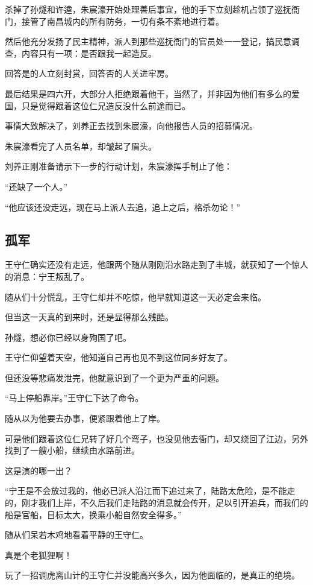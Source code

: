 \begin{multicols}{\theparacolNo}
		杀掉了孙燧和许逵，朱宸濠开始处理善后事宜，他的手下立刻趁机占领了巡抚衙门，接管了南昌城内的所有防务，一切有条不紊地进行着。

		然后他充分发扬了民主精神，派人到那些巡抚衙门的官员处一一登记，搞民意调查，内容只有一项：是否跟我一起造反。

		回答是的人立刻封赏，回答否的人关进牢房。

		最后结果是四六开，大部分人拒绝跟着他干，当然了，并非因为他们有多么的爱国，只是觉得跟着这位仁兄造反没什么前途而已。

		事情大致解决了，刘养正去找到朱宸濠，向他报告人员的招募情况。

		朱宸濠看完了人员名单，却皱起了眉头。

		刘养正刚准备请示下一步的行动计划，朱宸濠挥手制止了他：

		“还缺了一个人。”

		“他应该还没走远，现在马上派人去追，追上之后，格杀勿论！”

		\subsection{孤军}
		王守仁确实还没有走远，他跟两个随从刚刚沿水路走到了丰城，就获知了一个惊人的消息：宁王叛乱了。

		随从们十分慌乱，王守仁却并不吃惊，他早就知道这一天必定会来临。

		但当这一天真的到来时，还是显得那么残酷。

		孙燧，想必你已经以身殉国了吧。

		王守仁仰望着天空，他知道自己再也见不到这位同乡好友了。

		但还没等悲痛发泄完，他就意识到了一个更为严重的问题。

		“马上停船靠岸。”王守仁下达了命令。

		随从以为他要去办事，便紧跟着他上了岸。

		可是他们跟着这位仁兄转了好几个弯子，也没见他去衙门，却又绕回了江边，另外找到了一艘小船，继续由水路前进。

		这是演的哪一出？

		“宁王是不会放过我的，他必已派人沿江而下追过来了，陆路太危险，是不能走的，刚才我们上岸，不久后我们走陆路的消息就会传开，足以引开追兵，而我们的船是官船，目标太大，换乘小船自然安全得多。”

		随从们呆若木鸡地看着平静的王守仁。

		真是个老狐狸啊！

		玩了一招调虎离山计的王守仁并没能高兴多久，因为他面临的，是真正的绝境。


\end{multicols}
